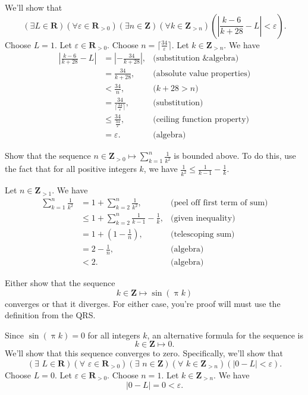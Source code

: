 \documentclass[12pt,fleqn,answers]{exam}
\newcommand{\reals}{\mathbf{R}}
\newcommand{\integers}{\mathbf{Z}}
\begin{document}
\begin{questions}
\begin{solution}
We'll show that
\[
 (\exists L \in \reals)
 (\forall \varepsilon \in \reals_{>0})
 (\exists n \in \integers)
(\forall k \in \integers_{>n}) 
\left ( \left |\frac{k-6}{k+28} - L \right | < \varepsilon \right ).
\]
Choose $L=1$. Let \(\varepsilon \in \reals_{>0} \).
Choose $n = \lceil \frac{34}{\varepsilon} \rceil$.
Let $k \in \integers_{>n}$. We have
\begin{align*}
  \left|\frac{k-6}{k+28} - L \right| &= \left |-\frac{34}{k+28} \right |,  &\mbox{(substitution \& algebra)}\\
                         &= \frac{34}{k+28}, &\mbox{(absolute value properties)} \\
                         &< \frac{34}{n}, &\mbox{($k + 28 > n$)} \\
                         &= \frac{34}{\lceil \frac{34}{\varepsilon} \rceil}, &\mbox{(substitution)} \\
                         &\leq \frac{34}{\frac{34}{\varepsilon}}, &\mbox{(ceiling function property)}\\
                         &= \varepsilon. &\mbox{(algebra)}
\end{align*}
\end{solution}
\question Show that the sequence $n \in \integers_{>0} \mapsto \sum_{k=1}^n \frac{1}{k^2}$ is
bounded above. To do this, use the fact that for all positive integers $k$, we have 
$\frac{1}{k^2} \leq \frac{1}{k-1} - \frac{1}{k}$.
\begin{solution}
  Let $n \in \integers_{>1}$. We have
  \begin{align*}
    \sum_{k=1}^n \frac{1}{k^2} &= 1 + \sum_{k=2}^n \frac{1}{k^2}, &\mbox{(peel off first term of sum)}\\
    &\leq 1 + \sum_{k=2}^n \frac{1}{k-1} - \frac{1}{k}, &\mbox{(given inequality)}\\
    &= 1 + \left(1 - \frac{1}{n} \right), &\mbox{(telescoping sum)} \\
    &= 2 - \frac{1}{n}, &\mbox{(algebra)}\\
    &< 2. &\mbox{(algebra)}
  \end{align*}
  
\end{solution}
\question Either show that the sequence
\[
      k \in \integers \mapsto \sin(\uppi k)
\]
converges or that it diverges. For either case, you're proof will
must use the definition from the QRS.

\begin{solution}
Since \(\sin(\uppi k) = 0\) for all integers $k$, an
alternative formula for the sequence is 
\[
      k \in \integers \mapsto 0.
\]
We'll show that this sequence converges to zero.
Specifically, we'll show that
\[
 (\exists \,\, L \in \reals)
 (\forall \,\, \varepsilon \in \reals_{>0})
 (\exists \,\, n \in \integers)
(\forall \,\, k \in \integers_{>n}) 
\left ( \left |0 - L \right | < \varepsilon \right ).
\]
Choose $L=0$. Let \(\varepsilon \in \reals_{>0} \).
Choose $n = 1$.
Let $k \in \integers_{>n}$. We have
\[
  \left |0 - L \right | = 0 < \varepsilon.
\]



\end{solution}
\end{questions}
\end{document}
